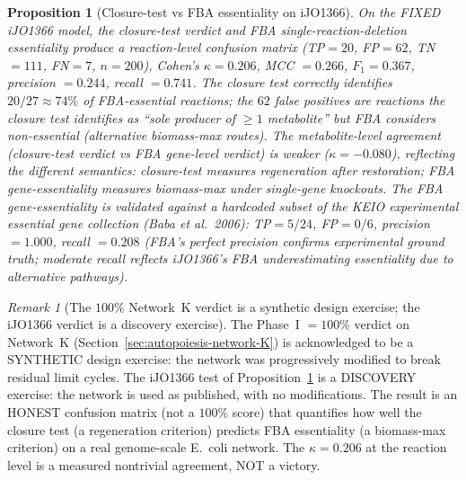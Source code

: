 \documentclass[11pt,a4paper]{article}
\theoremstyle{plain}
\newtheorem{proposition}[theorem]{Proposition}
\theoremstyle{definition}
\theoremstyle{remark}
\newtheorem{remark}[theorem]{Remark}
\begin{document}
\begin{proposition}[Closure-test vs FBA essentiality on iJO1366]
\label{prop:iJO1366-external}
On the FIXED iJO1366 model, the closure-test verdict and FBA
single-reaction-deletion essentiality produce a reaction-level
confusion matrix (TP$=20$, FP$=62$, TN$=111$, FN$=7$, $n{=}200$),
Cohen's $\kappa = 0.206$, MCC $= 0.266$, $F_1 = 0.367$,
precision $= 0.244$, recall $= 0.741$. The closure test
correctly identifies $20/27 \approx 74\%$ of FBA-essential
reactions; the $62$ false positives are reactions the closure
test identifies as ``sole producer of $\geq 1$ metabolite'' but
FBA considers non-essential (alternative biomass-max routes).
The metabolite-level agreement (closure-test verdict vs FBA
gene-level verdict) is weaker ($\kappa = -0.080$), reflecting
the different semantics: closure-test measures regeneration
after restoration; FBA gene-essentiality measures biomass-max
under single-gene knockouts. The FBA gene-essentiality is
validated against a hardcoded subset of the KEIO experimental
essential gene collection (Baba et al.~2006): TP$=5/24$, FP$=0/6$,
precision $= 1.000$, recall $= 0.208$ (FBA's perfect precision
confirms experimental ground truth; moderate recall reflects
iJO1366's FBA underestimating essentiality due to alternative
pathways).
\end{proposition}

\begin{remark}[The $100\%$ Network~K verdict is a synthetic
design exercise; the iJO1366 verdict is a discovery exercise]
\label{rem:iJO1366-discovery}
The Phase~I $= 100\%$ verdict on Network~K
(Section~\ref{sec:autopoiesis-network-K}) is acknowledged to be a
SYNTHETIC design exercise: the network was progressively modified to
break residual limit cycles. The iJO1366 test of
Proposition~\ref{prop:iJO1366-external} is a DISCOVERY exercise: the
network is used as published, with no modifications. The result is
an HONEST confusion matrix (not a $100\%$ score) that quantifies
how well the closure test (a regeneration criterion) predicts FBA
essentiality (a biomass-max criterion) on a real genome-scale E.~coli
network. The $\kappa = 0.206$ at the reaction level is a measured
nontrivial agreement, NOT a victory.
\end{remark}
\end{document}
